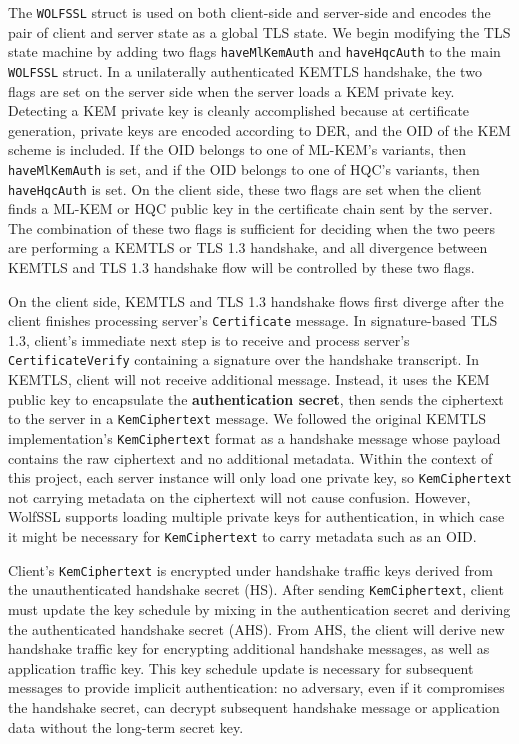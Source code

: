 \documentclass[letterpaper,12pt,titlepage,oneside,final]{book}
\begin{document}
The \texttt{WOLFSSL} struct is used on both client-side and server-side and encodes the pair of client and server state as a global TLS state.
We begin modifying the TLS state machine by adding two flags \texttt{haveMlKemAuth} and \texttt{haveHqcAuth} to the main \texttt{WOLFSSL} struct.
In a unilaterally authenticated KEMTLS handshake, the two flags are set on the server side when the server loads a KEM private key.
Detecting a KEM private key is cleanly accomplished because at certificate generation, private keys are encoded according to DER, and the OID of the KEM scheme is included.
If the OID belongs to one of ML-KEM's variants, then \texttt{haveMlKemAuth} is set, and if the OID belongs to one of HQC's variants, then \texttt{haveHqcAuth} is set.
On the client side, these two flags are set when the client finds a ML-KEM or HQC public key in the certificate chain sent by the server.
The combination of these two flags is sufficient for deciding when the two peers are performing a KEMTLS or TLS 1.3 handshake, and all divergence between KEMTLS and TLS 1.3 handshake flow will be controlled by these two flags.

On the client side, KEMTLS and TLS 1.3 handshake flows first diverge after the client finishes processing server's \texttt{Certificate} message. 
In signature-based TLS 1.3, client's immediate next step is to receive and process server's \texttt{CertificateVerify} containing a signature over the handshake transcript.
In KEMTLS, client will not receive additional message. Instead, it uses the KEM public key to encapsulate the \textbf{authentication secret}, then sends the ciphertext to the server in a \texttt{KemCiphertext} message.
We followed the original KEMTLS implementation's \texttt{KemCiphertext} format as a handshake message whose payload contains the raw ciphertext and no additional metadata.
Within the context of this project, each server instance will only load one private key, so \texttt{KemCiphertext} not carrying metadata on the ciphertext will not cause confusion.
However, WolfSSL supports loading multiple private keys for authentication, in which case it might be necessary for \texttt{KemCiphertext} to carry metadata such as an OID.

Client's \texttt{KemCiphertext} is encrypted under handshake traffic keys derived from the unauthenticated handshake secret (HS).
After sending \texttt{KemCiphertext}, client must update the key schedule by mixing in the authentication secret and deriving the authenticated handshake secret (AHS).
From AHS, the client will derive new handshake traffic key for encrypting additional handshake messages, as well as application traffic key.
This key schedule update is necessary for subsequent messages to provide implicit authentication: no adversary, even if it compromises the handshake secret, can decrypt subsequent handshake message or application data without the long-term secret key.
\end{document}
